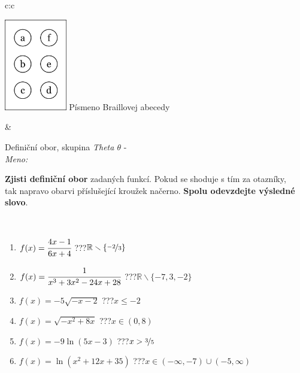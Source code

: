 \documentclass[10pt]{report}
\begin{document}
\begin{tabular}{c:c}
\begin{minipage}[c][104.5mm][t]{0.5\linewidth}
\begin{center}
\begin{minipage}{0.20\linewidth}
\begin{center}
\includegraphics[height=40mm]{../images/braille.png}
{\small Písmeno Braillovej abecedy}
\end{center}
\end{minipage}
\end{center}
\end{minipage}
&
\begin{minipage}[c][104.5mm][t]{0.5\linewidth}
\begin{center}
\vspace{7mm}
{\huge Definiční obor, skupina \textit{Theta $\theta$} -}\\[5mm]
\textit{Meno:}\phantom{xxxxxxxxxxxxxxxxxxxxxxxxxxxxxxxxxxxxxxxxxxxxxxxxxxxxxxxxxxxxxxxxx}\\[5mm]
\begin{minipage}{0.95\linewidth}
\textbf{Zjisti definiční obor} zadaných funkcí. Pokud se shoduje s tím za otazníky,\\tak napravo obarvi příslušející kroužek načerno. \textbf{Spolu odevzdejte výsledné slovo}.
\end{minipage}
\\[1mm]
\begin{minipage}{0.79\linewidth}
\begin{center}
\begin{varwidth}{\linewidth}
\begin{enumerate}
\normalsizerrr
\item $f(x)=\cfrac{4x-1}{6x+4}$\quad \dotfill\; ???\;\dotfill \quad $\mathbb{R}\smallsetminus\{\nicefrac{-2}{3}\}$
\item $f(x)=\cfrac{1}{x^3+3x^2-24x+28}$\quad \dotfill\; ???\;\dotfill \quad $\mathbb{R}\smallsetminus\{-7,3,-2\}$
\item $f(x)=-5\sqrt{-x-2}$\quad \dotfill\; ???\;\dotfill \quad $x\leq-2$
\item $f(x)=\sqrt{-x^2+8x}$\quad \dotfill\; ???\;\dotfill \quad $x\in(0 , 8)$
\item $f(x)=-9\ln{(5x-3)}$\quad \dotfill\; ???\;\dotfill \quad $x>\nicefrac{3}{5}$
\item $f(x)=\ln{(x^2+12x+35)}$\quad \dotfill\; ???\;\dotfill \quad $x\in(-\infty , -7)\cup(-5 , \infty)$

\end{enumerate}
\end{varwidth}
\end{center}
\end{minipage}
\end{center}
\end{minipage}
\end{tabular}
\end{document}
